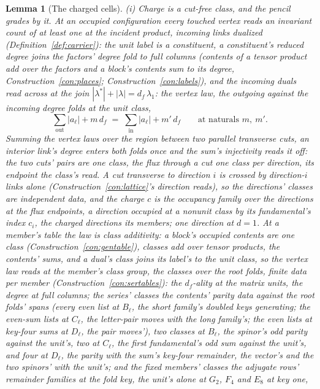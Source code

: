 \documentclass[11pt]{article}
\newtheorem{lemma}{Lemma}
\theoremstyle{definition}
\begin{document}
\begin{lemma}[The charged cells]
\emph{(i) Charge is a cut-free class, and the pencil grades by it.} At an
occupied configuration every touched vertex reads an invariant count
of at least one at the incident product, incoming links dualized
(Definition~\ref{def:carrier}): the unit label is a constituent, a
constituent's reduced degree joins the factors' degree fold to full
columns (contents of a tensor product add over the factors and a
block's
contents sum to its degree, Construction~\ref{con:places};
Construction~\ref{con:labels}), and the incoming duals read across
at the join $|\lambda^*|+|\lambda|=d_f\,\lambda_1$: the \emph{vertex
law}, the outgoing against the incoming degree folds at the unit
class,
\[
\sum_{\mathrm{out}}|a_\ell|+m\,d_f
\;=\;\sum_{\mathrm{in}}|a_\ell|+m'\,d_f
\qquad\text{at naturals }m,\ m'.
\]
Summing the vertex laws over the region between two parallel
transverse cuts, an interior link's degree enters both folds once
and the sum's injectivity reads it off: the two cuts' pairs are one
class, the \emph{flux} through a cut one class per direction, its
endpoint the class's read. A cut transverse to direction $i$ is
crossed by direction-$i$ links alone
(Construction~\ref{con:lattice}'s direction reads), so the
directions' classes are
independent data, and the \emph{charge} $c$ is the occupancy family
over the directions at the flux endpoints, a direction occupied at a
nonunit class by its fundamental's index $c_i$, the \emph{charged
directions} its members; one direction at $d=1$. At a member's
table the law is class additivity: a block's occupied contents
are one class (Construction~\ref{con:gentable}), classes add over
tensor products, the contents' sums, and a dual's class joins its
label's to the unit class, so the vertex law reads at the
member's \emph{class group}, the classes over the root folds,
finite data per member (Construction~\ref{con:sertables}): the
$d_f$-ality at the matrix units, the degree at full columns; the
series' classes the contents' parity data against the root folds'
spans (every even list at $B_\ell$, the short family's doubled
keys generating; the even-sum lists at $C_\ell$, the letter-pair
moves with the long family's; the even lists at key-four sums at
$D_\ell$, the pair moves'), two classes at $B_\ell$, the
spinor's odd parity against the unit's, two at $C_\ell$, the
first fundamental's odd sum against the unit's, and four at
$D_\ell$, the parity with the sum's key-four remainder, the
vector's and the two spinors' with the unit's; and the fixed
members' classes the adjugate rows' remainder families at the
fold key, the unit's alone at $G_2$, $F_4$ and $E_8$ at key one,

\end{lemma}
\end{document}
